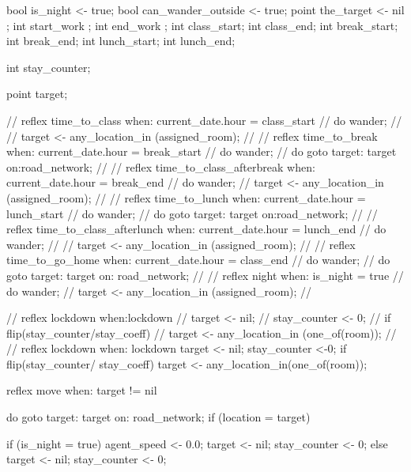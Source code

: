 \begin{verbatimtab}[4]
{{            bool is_night <- true;
            bool can_wander_outside <- true;
            point the_target <- nil ;
            int start_work ;
            int end_work  ;
            int class_start;
            int class_end;
            int break_start;
            int break_end;
            int lunch_start;
            int lunch_end;
            
            int stay_counter;
        
            
            point target;
            
    //	reflex time_to_class when: current_date.hour = class_start{
    //		do wander;
    //		
    //		target <- any_location_in (assigned_room);
    //	}
    //	reflex time_to_break when: current_date.hour = break_start{
    //		do wander;
    //		do goto target: target on:road_network;	
    //	}
    //	reflex time_to_class_afterbreak when: current_date.hour = break_end{
    //		do wander;
    //		target <- any_location_in (assigned_room);	
    //	}
    //	reflex time_to_lunch when: current_date.hour = lunch_start{
    //		do wander;
    //		do goto target: target on:road_network;	
    //	}
    //	reflex time_to_class_afterlunch when: current_date.hour = lunch_end{
    //		do wander;
    //		
    //		target <- any_location_in (assigned_room);
    //	}	
    //	reflex time_to_go_home when: current_date.hour = class_end{
    //		do wander;
    //		do goto target: target on: road_network;
    //	} 
    //	reflex night when: is_night = true{
    //		do wander;
    //		target <- any_location_in (assigned_room);
    //	}
    
    //	reflex lockdown when:lockdown {
    //		target <- nil;
    //		stay_counter <- 0;
    //		if flip(stay_counter/stay_coeff){
    //			target <- any_location_in (one_of(room));
    //		}
    //	}
        reflex lockdown when: lockdown{
            target <- nil;
            stay_counter <-0;
            if flip(stay_counter/ stay_coeff){
                target <- any_location_in(one_of(room));
            }
        }
        
        reflex move when: target != nil {
            do goto target: target on: road_network;
            if (location = target) {
                if (is_night = true){
                    agent_speed <- 0.0;
                    target <- nil;
                    stay_counter <- 0;
                } else{
                    target <- nil;
                    stay_counter <- 0;
                }
                
            }
            
}}}
\end{verbatimtab}
